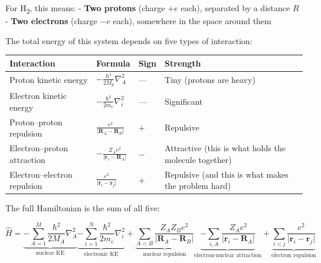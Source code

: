 \documentclass[
  11pt,
  oneside]{book}
\begin{document}
For H\textsubscript{2}, this means: - \textbf{Two protons} (charge \(+e\) each),
separated by a distance \(R\) - \textbf{Two electrons} (charge \(-e\)
each), somewhere in the space around them

The total energy of this system depends on five types of interaction:

\begin{longtable}[]{@{}
  >{\raggedright\arraybackslash}p{}
  >{\raggedright\arraybackslash}p{}
  >{\centering\arraybackslash}p{}
  >{\raggedright\arraybackslash}p{}@{}}
\toprule\noalign{}
\begin{minipage}[b]{\linewidth}\raggedright
Interaction
\end{minipage} & \begin{minipage}[b]{\linewidth}\raggedright
Formula
\end{minipage} & \begin{minipage}[b]{\linewidth}\centering
Sign
\end{minipage} & \begin{minipage}[b]{\linewidth}\raggedright
Strength
\end{minipage} \\
\midrule\noalign{}
\endhead
\bottomrule\noalign{}
\endlastfoot
Proton kinetic energy & \(-\frac{\hbar^2}{2M_p}\nabla_A^2\) & --- & Tiny
(protons are heavy) \\
Electron kinetic energy & \(-\frac{\hbar^2}{2m_e}\nabla_i^2\) & --- &
Significant \\
Proton--proton repulsion &
\(\frac{e^2}{\lvert\mathbf{R}_A - \mathbf{R}_B\rvert}\) & \(+\) &
Repulsive \\
Electron--proton attraction &
\(-\frac{Z_A e^2}{\lvert\mathbf{r}_i - \mathbf{R}_A\rvert}\) & \(-\) &
Attractive (this is what holds the molecule together) \\
Electron--electron repulsion &
\(\frac{e^2}{\lvert\mathbf{r}_i - \mathbf{r}_j\rvert}\) & \(+\) &
Repulsive (and this is what makes the problem hard) \\
\end{longtable}

The full Hamiltonian is the sum of all five:

\[
\hat{H} = \underbrace{-\sum_{A=1}^{M} \frac{\hbar^2}{2M_A} \nabla_A^2}_{\text{nuclear KE}}
         \underbrace{-\sum_{i=1}^{N} \frac{\hbar^2}{2m_e} \nabla_i^2}_{\text{electronic KE}}
         + \underbrace{\sum_{A<B} \frac{Z_A Z_B e^2}{\lvert\mathbf{R}_A - \mathbf{R}_B\rvert}}_{\text{nuclear repulsion}}
         \underbrace{- \sum_{i,A} \frac{Z_A e^2}{\lvert\mathbf{r}_i - \mathbf{R}_A\rvert}}_{\text{electron-nuclear attraction}}
         + \underbrace{\sum_{i<j} \frac{e^2}{\lvert\mathbf{r}_i - \mathbf{r}_j\rvert}}_{\text{electron repulsion}}
\]
\end{document}
